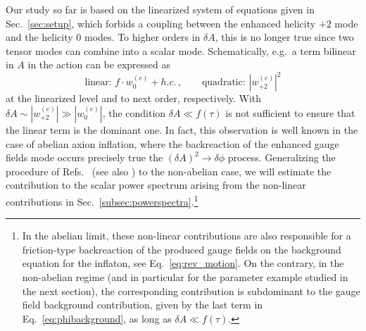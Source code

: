 {Our study so far is based on the linearized system of equations given in Sec.~\ref{sec:setup}, which forbids a coupling between the enhanced helicity $+2$ mode and the helicity $0$ modes. To higher orders in $\delta A$, this is no longer true since two tensor modes can combine into a scalar mode. Schematically, e.g.\ a  term bilinear in $A$ in the action can be expressed as
\begin{equation}
 \text{linear: }  f \cdot w_0^{(e)} + h.c. \,, \qquad \text{quadratic: }  |w_{+2}^{(e)}|^2  
 \label{eq:caveat}
\end{equation}
at the linearized level and to next order, respectively. With $\delta A \sim |w_{+2}^{(e)}| \gg |w_{0}^{(e)}|$, the condition $\delta A \ll f(\tau)$ is not sufficient to ensure that the linear term is the dominant one.  
In fact, this observation is well known in the case of abelian axion inflation, where the backreaction of the enhanced gauge fields mode occurs precisely true the $(\delta A)^2 \rightarrow \delta \phi$ process. Generalizing the procedure of Refs.~\cite{Linde:2012bt} (see also \cite{Barnaby:2011qe}) to the non-abelian case, we will estimate the contribution to the scalar power spectrum arising from the non-linear contributions in Sec.~\ref{subsec:powerspectra}.\footnote{{In the abelian limit, these non-linear contributions are also responsible for a friction-type backreaction of the produced gauge fields on the background equation for the inflaton, see Eq.~\eqref{eq:rev_motion}. On the contrary, in the non-abelian regime (and in particular for the parameter example studied in the next section), the corresponding contribution is subdominant to the gauge field background contribution, given by the last term in Eq.~\eqref{eq:phibackground}, as long as $\delta A \ll f(\tau)$.}}
}


